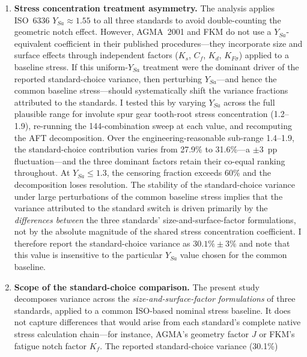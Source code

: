 \documentclass[12pt,a4paper]{article}
\begin{document}
\begin{enumerate}
  \item \textbf{Stress concentration treatment asymmetry.} The analysis
        applies ISO~6336 $Y_{Sa} \approx 1.55$ to all three standards to
        avoid double-counting the geometric notch effect. However, AGMA~2001
        and FKM do not use a $Y_{Sa}$-equivalent coefficient in their
        published procedures---they incorporate size and surface effects
        through independent factors ($K_s$, $C_f$, $K_d$, $K_{F\sigma}$)
        applied to a baseline stress. If this uniform-$Y_{Sa}$ treatment
        were the dominant driver of the reported standard-choice variance,
        then perturbing $Y_{Sa}$---and hence the common baseline
        stress---should systematically shift the variance fractions
        attributed to the standards. I tested this by varying $Y_{Sa}$
        across the full plausible range for involute spur gear tooth-root
        stress concentration (1.2--1.9), re-running the 144-combination
        sweep at each value, and recomputing the AFT decomposition. Over
        the engineering-reasonable sub-range 1.4--1.9, the standard-choice
        contribution varies from 27.9\% to 31.6\%---a $\pm$3~pp
        fluctuation---and the three dominant factors retain their co-equal
        ranking throughout. At $Y_{Sa} \leq 1.3$, the censoring fraction
        exceeds 60\% and the decomposition loses resolution. The
        stability of the standard-choice variance under large perturbations
        of the common baseline stress implies that the variance attributed
        to the standard switch is driven primarily by the
        \emph{differences between} the three standards'
        size-and-surface-factor formulations, not by the absolute magnitude
        of the shared stress concentration coefficient. I therefore report
        the standard-choice variance as $30.1\% \pm 3\%$ and note that
        this value is insensitive to the particular $Y_{Sa}$ value chosen
        for the common baseline.%
  \item \textbf{Scope of the standard-choice comparison.} The present study
        decomposes variance across the \emph{size-and-surface-factor
        formulations} of three standards, applied to a common ISO-based
        nominal stress baseline. It does not capture differences that would
        arise from each standard's complete native stress calculation
        chain---for instance, AGMA's geometry factor $J$ or FKM's fatigue
        notch factor $K_f$. The reported standard-choice variance (30.1\%)

\end{enumerate}
\end{document}
